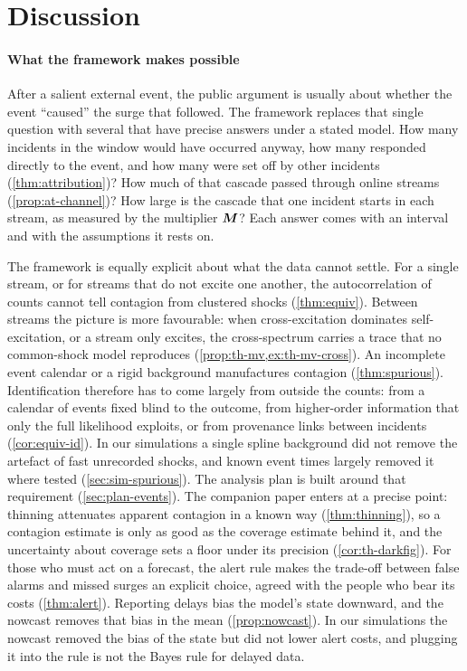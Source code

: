 \section{Discussion}\label{sec:discussion}

\paragraph{What the framework makes possible}
After a salient external event, the public argument is usually about whether
the event ``caused'' the surge that followed. The framework replaces that
single question with several that have precise answers under a stated model.
How many incidents in the window would have occurred anyway, how many
responded directly to the event, and how many were set off by other incidents
(\cref{thm:attribution})? How much of that cascade passed through online
streams (\cref{prop:at-channel})? How large is the cascade that one incident
starts in each stream, as measured by the multiplier $\bm{M}$? Each answer
comes with an interval and with the assumptions it rests on.

The framework is equally explicit about what the data cannot settle. For a
single stream, or for streams that do not excite one another, the
autocorrelation of counts cannot tell contagion from clustered shocks
(\cref{thm:equiv}). Between streams the picture is more favourable: when
cross-excitation dominates self-excitation, or a stream only excites, the
cross-spectrum carries a trace that no common-shock model reproduces
(\cref{prop:th-mv,ex:th-mv-cross}). An incomplete event calendar or a rigid
background manufactures contagion (\cref{thm:spurious}). Identification
therefore has to come largely from outside the counts: from a calendar of
events fixed blind to the outcome, from higher-order information that only
the full likelihood exploits, or from provenance links between incidents
(\cref{cor:equiv-id}). In our simulations a single spline background did not
remove the artefact of fast unrecorded shocks, and known event times largely
removed it where tested (\cref{sec:sim-spurious}). The analysis plan is built
around that requirement (\cref{sec:plan-events}). The companion paper enters
at a precise point: thinning attenuates apparent contagion in a known way
(\cref{thm:thinning}), so a contagion estimate is only as good as the
coverage estimate behind it, and the uncertainty about coverage sets a floor
under its precision (\cref{cor:th-darkfig}). For those who must act on a
forecast, the alert rule makes the trade-off between false alarms and missed
surges an explicit choice, agreed with the people who bear its costs
(\cref{thm:alert}). Reporting delays bias the model's state downward, and the
nowcast removes that bias in the mean (\cref{prop:nowcast}). In our simulations
the nowcast removed the bias of the state but did not lower alert costs, and
plugging it into the rule is not the Bayes rule for delayed data.

